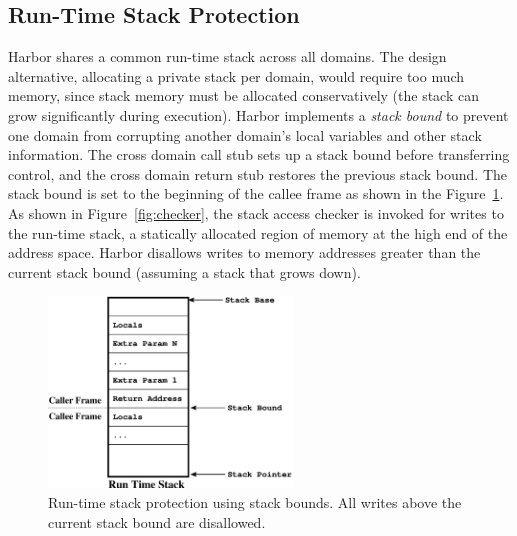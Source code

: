 \subsection{Run-Time Stack Protection}
\label{subsec:stackguard}
%

Harbor shares a common run-time stack across all domains.
%
The design alternative, allocating a private stack per domain,
%
would require too much memory, since stack memory must be allocated
conservatively (the stack can grow significantly during execution).
%
%
%
Harbor implements a \emph{stack bound} to prevent one domain from
corrupting another domain's local variables and other stack
information.
%
The cross domain call stub sets up a stack bound before transferring
control, and the cross domain return stub restores the previous stack
bound.
%
The stack bound is set to the beginning of the callee frame as shown
in the Figure~\ref{fig:stackbound}.
%
As shown in Figure~\ref{fig:checker}, the stack access checker is invoked
for writes to the run-time stack, a statically allocated region of memory
at the high end of the address space.
%
Harbor disallows writes to memory addresses greater than the current stack
bound (assuming a stack that grows down).
%
%
%
\begin{figure}[htbp]
   \centering
   \includegraphics[height=2.0in, keepaspectratio=true]{figures/stack_bounds.eps} 
   \caption[Run-time stack protection using stack bounds]{Run-time stack protection using stack bounds. All writes
     above the current stack bound are disallowed.}
   \label{fig:stackbound}
\end{figure}


